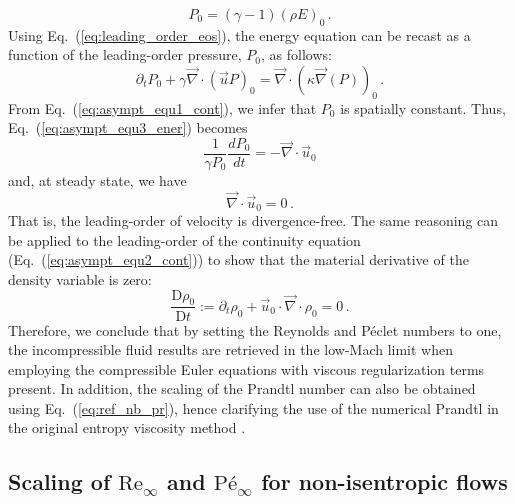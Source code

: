 \documentclass[review,10pt]{elsarticle}
\renewcommand{\div}{\vec{\nabla}\! \cdot \!}
\newcommand{\grad}{\vec{\nabla}}
\renewcommand{\Re}{\textrm{Re}}
\newcommand{\Pe}{\textrm{P\'e}}
\newcommand{\matder}[1]{\frac{\textrm{D} #1}{\textrm{D} t}}
\newcommand{\eqt}[1]{Eq.~(\ref{#1})}                     %
\begin{document}
\begin{equation}
\label{eq:leading_order_eos}
 P_0 = (\gamma - 1) (\rho E)_0 \,.
\end{equation}
%
Using \eqt{eq:leading_order_eos}, the energy equation can be recast as a function of the leading-order pressure, $P_0$, as follows:
%
\begin{equation}\label{eq:asympt_equ3_ener}
 \partial_t P_0 + \gamma \div \left( \vec{u} P \right)_0 =  \div(\kappa \grad(P))_0 \,.
\end{equation}
%
From \eqt{eq:asympt_equ1_cont}, we infer that $P_0$ is spatially constant. Thus, \eqt{eq:asympt_equ3_ener} becomes
%
\begin{equation}
\frac{1}{\gamma P_0} \frac{d P_0}{dt} = - \div \vec{u}_0 
\end{equation}
%
and, at steady state, we have
%
\begin{equation}
 \div  \vec{u}_0 = 0 \, .
\end{equation}
%
That is, the leading-order of velocity is divergence-free. The same reasoning can be applied to the leading-order 
of the continuity equation (\eqt{eq:asympt_equ2_cont}) to show that the material derivative of the density variable is zero:
\begin{equation}
\matder{\rho_0} := \partial_t \rho_0 + \vec{u}_0 \cdot \div \rho_0 = 0 \, .
\end{equation}
%
Therefore, we conclude that by setting the Reynolds and P\'eclet numbers to one, the incompressible fluid 
results are retrieved in the low-Mach limit when employing the compressible Euler equations with viscous 
regularization terms present. In addition, the scaling of the Prandtl number can also be obtained 
using \eqt{eq:ref_nb_pr}, hence clarifying the use of the numerical Prandtl in the original entropy viscosity method \cite{jlg1}.

\subsection{Scaling of $\Re_\infty$ and $\Pe_\infty$ for non-isentropic flows} \label{sec:nonisentropic}
\end{document}
